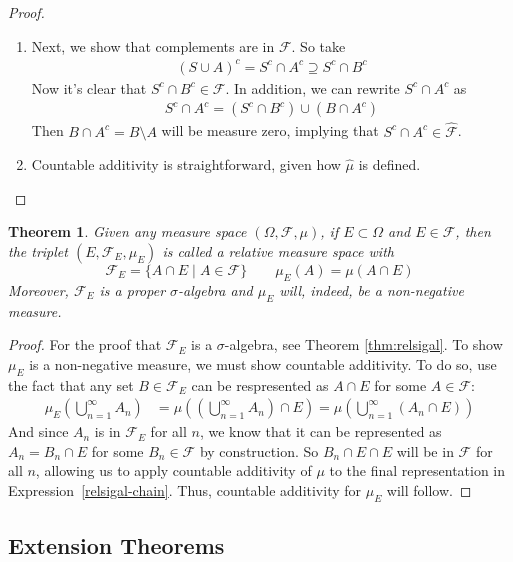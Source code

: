 \documentclass[12pt]{article}
\theoremstyle{plain}
\newtheorem{thm}{Theorem}[section]
\theoremstyle{definition}
\theoremstyle{remark}
\newcommand{\sF}{\mathscr{F}}
\begin{document}
\begin{proof}
\begin{enumerate}
  \item
    Next, we show that complements are in $\sF$. So take
    \begin{align*}
      (S\cup A)^c = S^c \cap A^c \supseteq S^c \cap B^c
    \end{align*}
    Now it's clear that $S^c \cap B^c\in \sF$. In addition, we can
    rewrite $S^c\cap A^c$ as
    \begin{align*}
      S^c\cap A^c = (S^c \cap B^c) \cup (B\cap A^c)
    \end{align*}
    Then $B \cap A^c = B\setminus A$ will be measure zero, implying that
    $S^c \cap A^c\in \hat{\sF}$.

  \item Countable additivity is straightforward, given how $\hat{\mu}$
    is defined.
\end{enumerate}
\end{proof}

\begin{thm}
Given any measure space $(\Omega,\sF,\mu)$, if $E\subset \Omega$ and
$E\in\sF$, then the triplet $(E,\sF_E,\mu_E)$ is called
a \emph{relative measure space} with
\[
    \sF_E = \{ A \cap E \; | \; A \in \sF\}
    \qquad
    \mu_E(A) = \mu(A\cap E)
\]
Moreover, $\sF_E$ is a proper $\sigma$-algebra and $\mu_E$ will,
indeed, be a non-negative measure.
\end{thm}
\begin{proof}
For the proof that $\sF_E$ is a $\sigma$-algebra, see Theorem
\ref{thm:relsigal}. To show $\mu_E$ is a non-negative measure, we must
show countable additivity. To do so, use the fact that any set
$B\in\sF_E$ can be respresented as $A\cap E$ for some $A\in\sF$:
\begin{align}
    \label{relsigal-chain}
    \mu_E\left(\bigcup^\infty_{n=1} A_n \right)
    &= \mu\left(\left(\bigcup^\infty_{n=1} A_n
    \right) \cap E \right)
    = \mu\left(\bigcup^\infty_{n=1} (A_n
    \cap E)\right)
\end{align}
And since $A_n$ is in $\sF_E$ for all $n$, we know that it can be
represented as $A_n=B_n\cap E$ for some $B_n\in \sF$ by construction. So
$B_n \cap E \cap E$ will be in $\sF$ for all $n$, allowing us to apply
countable additivity of $\mu$ to the final representation in
Expression~\ref{relsigal-chain}. Thus, countable additivity for $\mu_E$
will follow.
\end{proof}

\subsection{Extension Theorems}
\end{document}
